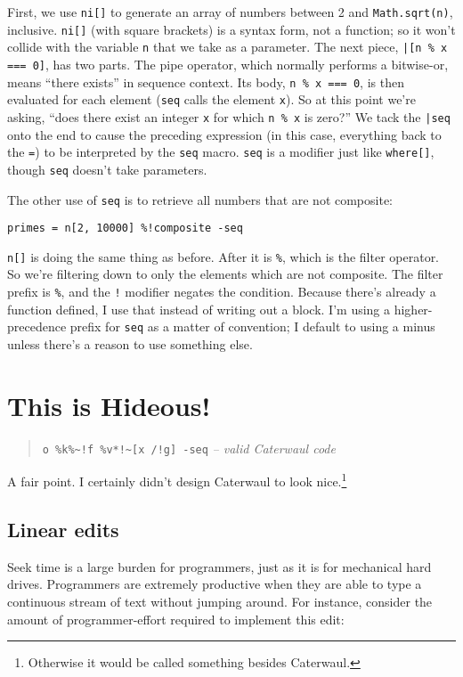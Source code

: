 \documentclass{report}
\begin{document}
    First, we use {\tt ni[]} to generate an array of numbers between 2 and {\tt Math.sqrt(n)}, inclusive. {\tt ni[]} (with square brackets) is a syntax form, not a function; so it won't collide
    with the variable {\tt n} that we take as a parameter. The next piece, \verb+|[n % x === 0]+, has two parts. The pipe operator, which normally performs a bitwise-or, means ``there exists''
    in sequence context. Its body, \verb|n % x === 0|, is then evaluated for each element ({\tt seq} calls the element {\tt x}). So at this point we're asking, ``does there exist an integer
    {\tt x} for which {\tt n \% x} is zero?'' We tack the \verb+|seq+ onto the end to cause the preceding expression (in this case, everything back to the {\tt =}) to be interpreted by the
    {\tt seq} macro. {\tt seq} is a modifier just like {\tt where[]}, though {\tt seq} doesn't take parameters.

    The other use of {\tt seq} is to retrieve all numbers that are not composite:

\begin{verbatim}
primes = n[2, 10000] %!composite -seq
\end{verbatim}

    {\tt n[]} is doing the same thing as before. After it is {\tt \%}, which is the filter operator. So we're filtering down to only the elements which are not composite. The filter prefix is
    \verb|%|, and the \verb|!| modifier negates the condition. Because there's already a function defined, I use that instead of writing out a block. I'm using a higher-precedence prefix for
    {\tt seq} as a matter of convention; I default to using a minus unless there's a reason to use something else.

\chapter{This is Hideous!}\label{sec:this-is-hideous}
\begin{quote}
\verb|o %k%~!f %v*!~[x /!g] -seq|
\hfill \textit{-- valid Caterwaul code}
\end{quote}

  A fair point. I certainly didn't design Caterwaul to look nice.\footnote{Otherwise it would be called something besides Caterwaul.}

\section{Linear edits}
    Seek time is a large burden for programmers, just as it is for mechanical hard drives. Programmers are extremely productive when they are able to type a continuous stream of text without
    jumping around. For instance, consider the amount of programmer-effort required to implement this edit:
\end{document}
